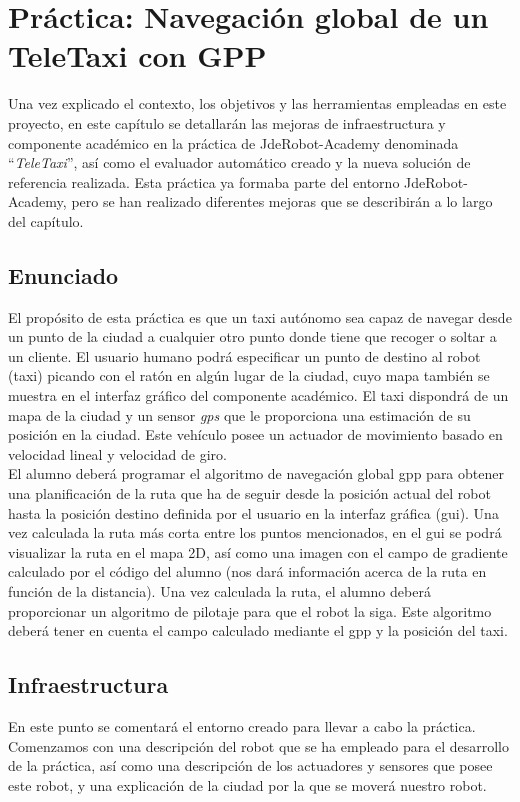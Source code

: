 \chapter{Práctica: Navegación global de un TeleTaxi con GPP}\label{cap.gpp}
 Una vez explicado el contexto, los objetivos y las herramientas empleadas en este proyecto, en este capítulo se detallarán las mejoras de infraestructura y componente académico en la práctica de JdeRobot-Academy denominada ``\textit{TeleTaxi}'', así como el evaluador automático creado y la nueva solución de referencia realizada. Esta práctica ya formaba parte del entorno JdeRobot-Academy, pero se han realizado diferentes mejoras que se describirán a lo largo del capítulo.

\section{Enunciado} \label{sec.enunciado}
El propósito de esta práctica es que un taxi autónomo sea capaz de navegar desde un punto de la ciudad a cualquier otro punto donde tiene que recoger o soltar a un cliente. El usuario humano podrá especificar un punto de destino al robot (taxi) picando con el ratón en algún lugar de la ciudad, cuyo mapa también se muestra en el interfaz gráfico del componente académico. El taxi dispondrá de un mapa de la ciudad y un sensor \textit{\acrfull{gps}} que le proporciona una estimación de su posición en la ciudad. Este vehículo posee un actuador de movimiento basado en velocidad lineal y velocidad de giro.\\ 

El alumno deberá programar el algoritmo de navegación global \acrfull{gpp} para obtener una planificación de la ruta que ha de seguir desde la posición actual del robot hasta la posición destino definida por el usuario en la interfaz gráfica (\acrshort{gui}). Una vez calculada la ruta más corta entre los puntos mencionados, en el \acrshort{gui} se podrá visualizar la ruta en el mapa 2D, así como una imagen con el campo de gradiente calculado por el código del alumno (nos dará información acerca de la ruta en función de la distancia). Una vez calculada la ruta, el alumno deberá proporcionar un algoritmo de pilotaje para que el robot la siga. Este algoritmo deberá tener en cuenta el campo calculado mediante el \acrshort{gpp} y la posición del taxi. 

\section{Infraestructura}
En este punto se comentará el entorno creado para llevar a cabo la práctica. Comenzamos con una descripción del robot que se ha empleado para el desarrollo de la práctica, así como una descripción de los actuadores y sensores que posee este robot, y una explicación de la ciudad por la que se moverá nuestro robot.

